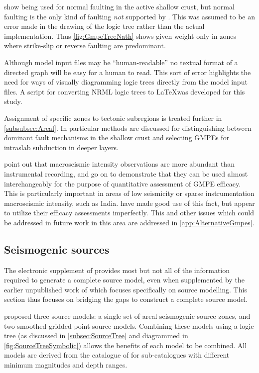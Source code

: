 \documentclass{article}
\begin{document}
\citet[Figure~3]{nath2012probabilistic} show \cite{sharma2009ground} being used for normal faulting in the active shallow crust, but normal faulting is the only kind of faulting \textit{not} supported by \cite{sharma2009ground}. 
This was assumed to be an error made in the drawing of the logic tree rather than the actual implementation.
Thus \autoref{fig:GmpeTreeNath} shows \cite{sharma2009ground} given weight only in zones where strike-slip or reverse faulting are predominant.

Although model input files may be ``human-readable'' no textual format of a directed graph will be easy for a human to read.
This sort of error highlights the need for ways of visually diagramming logic trees directly from the model input files. 
A script for converting NRML logic trees to \LaTeX\space was developed for this study.

Assignment of specific zones to tectonic subregions is treated further in \autoref{subsubsec:Areal}.
In particular methods are discussed for distinguishing between dominant fault mechanisms in the shallow crust and selecting GMPEs for intraslab subduction in deeper layers.

\cite{delavaud2009information} point out that macroseismic intensity observations are more abundant than instrumental recording, and go on to demonstrate that they can be used almost interchangeably for the purpose of quantitative assessment of GMPE efficacy.
This is particularly important in areas of low seismicity or sparse instrumentation macroseismic intensity, such as India.
\cite{nath2011peak} have made good use of this fact, but \cite{nath2012probabilistic} appear to utilize their efficacy assessments imperfectly. 
This and other issues which could be addressed in future work in this area are addressed in \autoref{app:AlternativeGmpes}.

\subsection{Seismogenic sources}
\label{subsec:Sources}

The electronic supplement of \cite{nath2012probabilistic} provides most but not all of the information required to generate a complete source model, even when supplemented by the earlier unpublished work of \cite{thingbaijam2011seismogenic} which focuses specifically on source modelling.
This section thus focuses on bridging the gaps to construct a complete source model.

\cite{nath2012probabilistic} proposed three source models: a single set of areal seismogenic source zones, and two smoothed-gridded point source models.
Combining these models using a logic tree (as discussed in \autoref{subsec:SourceTree} and diagrammed in  \autoref{fig:SourceTreeSymbolic}) allows the benefits of each model to be combined.
All models are derived from the catalogue of \cite{nath2010earthquake} for sub-catalogues with different minimum magnitudes and depth ranges.
\end{document}

